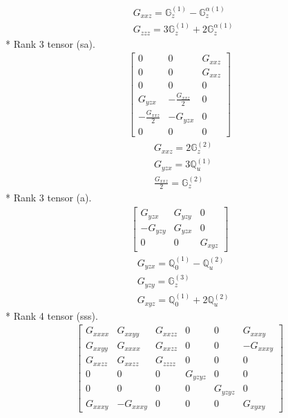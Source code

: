 \documentclass[fleqn,8pt,landscape]{jsarticle}
\begin{document}
\begin{align*}
& G_{xxz} = \mathbb{G}_{z}^{(1)} - \mathbb{G}_{z}^{\alpha(1)} \\
& G_{zzz} = 3 \mathbb{G}_{z}^{(1)} + 2 \mathbb{G}_{z}^{\alpha(1)}
\end{align*}
* Rank 3 tensor (sa).
\begin{align*}
\begin{bmatrix} 0 & 0 & G_{xxz} \\ 0 & 0 & G_{xxz} \\ 0 & 0 & 0 \\ G_{yzx} & - \frac{G_{xxz}}{2} & 0 \\ - \frac{G_{xxz}}{2} & - G_{yzx} & 0 \\ 0 & 0 & 0 \end{bmatrix}
\end{align*}
\begin{align*}
& G_{xxz} = 2 \mathbb{G}_{z}^{(2)} \\
& G_{yzx} = 3 \mathbb{Q}_{u}^{(1)} \\
& \frac{G_{xxz}}{2} = \mathbb{G}_{z}^{(2)}
\end{align*}
* Rank 3 tensor (a).
\begin{align*}
\begin{bmatrix} G_{yzx} & G_{yzy} & 0 \\ - G_{yzy} & G_{yzx} & 0 \\ 0 & 0 & G_{xyz} \end{bmatrix}
\end{align*}
\begin{align*}
& G_{yzx} = \mathbb{Q}_{0}^{(1)} - \mathbb{Q}_{u}^{(2)} \\
& G_{yzy} = \mathbb{G}_{z}^{(3)} \\
& G_{xyz} = \mathbb{Q}_{0}^{(1)} + 2 \mathbb{Q}_{u}^{(2)}
\end{align*}
* Rank 4 tensor (sss).
\begin{align*}
\begin{bmatrix} G_{xxxx} & G_{xxyy} & G_{xxzz} & 0 & 0 & G_{xxxy} \\ G_{xxyy} & G_{xxxx} & G_{xxzz} & 0 & 0 & - G_{xxxy} \\ G_{xxzz} & G_{xxzz} & G_{zzzz} & 0 & 0 & 0 \\ 0 & 0 & 0 & G_{yzyz} & 0 & 0 \\ 0 & 0 & 0 & 0 & G_{yzyz} & 0 \\ G_{xxxy} & - G_{xxxy} & 0 & 0 & 0 & G_{xyxy} \end{bmatrix}
\end{align*}
\end{document}
